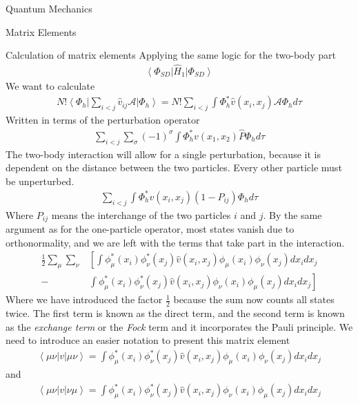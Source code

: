 \documentclass[twoside,english]{uiofysmaster}
\begin{document}
\begin{chapter}{Quantum Mechanics}
\begin{section}{Matrix Elements}
\begin{subsection}{Calculation of matrix elements}
			Applying the same logic for the two-body part
			\begin{align}
				\left< \Phi_{SD} \right| \hat H_1 \left| \Phi_{SD} \right>
			\end{align}
			We want to calculate 
			\begin{align}
				N! \left< \Phi_h \right| \sum_{i<j} \hat v_{ij} \mathcal{A} \left| \Phi_h \right> = N! \sum_{i<j} \int \Phi_h^* \hat v(x_i,x_j) \mathcal{A} \Phi_h d\tau
			\end{align}
			Written in terms of the perturbation operator
			\begin{align}
				\sum_{i<j} \sum_\sigma (-1)^\sigma \int \Phi_h^* v(x_1,x_2) \hat P \Phi_h d\tau
			\end{align}
			The two-body interaction will allow for a single perturbation, because it is dependent on the distance between the two particles. Every other particle must be unperturbed. 
			\begin{align} 
				\sum_{i<j} \int \Phi_h^* v(x_i,x_j) (1 - P_{ij}) \Phi_h d\tau
			\end{align}
			Where $P_{ij}$ means the interchange of the two particles $i$ and $j$. By the same argument as for the one-particle operator, most states vanish due to orthonormality, and we are left with the terms that take part in the interaction. 
			\begin{align}
				\frac{1}{2} \sum_\mu \sum_\nu & \left[ \int \phi_\mu^*(x_i) \phi_\nu^*(x_j) \hat v(x_i,x_j) \phi_\mu(x_i) \phi_\nu(x_j) d x_i d x_j \right.  \\     -& \left. \int \phi_\mu^*(x_i) \phi_\nu^*(x_j) \hat v(x_i,x_j) \phi_\nu(x_i) \phi_\mu(x_j) d x_i d x_j \right]
			\end{align}
			Where we have introduced the factor $\frac{1}{2}$ because the sum now counts all states twice. The first term is known as the direct term, and the second term is known as the \textit{exchange term} or the \textit{Fock} term and it incorporates the Pauli principle. We need to introduce an easier notation to present this matrix element
			\begin{align}
				\left< \mu \nu | v | \mu \nu \right> = \int \phi_\mu^*(x_i) \phi_\nu^*(x_j) \hat v(x_i,x_j) \phi_\mu(x_i) \phi_\nu(x_j) d x_i d x_j
			\end{align}
			and 
			\begin{align}
				\left< \mu \nu | v | \nu \mu \right> = \int \phi_\mu^*(x_i) \phi_\nu^*(x_j) \hat v(x_i,x_j) \phi_\nu(x_i) \phi_\mu(x_j) d x_i d x_j
			\end{align}

\end{subsection}
\end{section}
\end{chapter}
\end{document}
